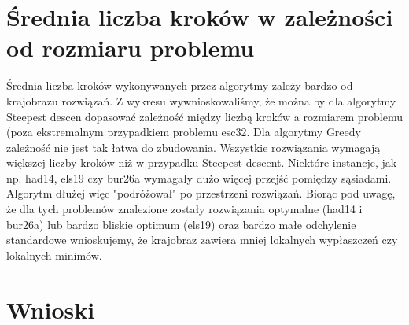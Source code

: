 \documentclass[a4paper,10pt]{article}
\begin{document}
\section{Średnia liczba kroków w zależności od rozmiaru problemu}
Średnia liczba kroków wykonywanych przez algorytmy zależy bardzo od krajobrazu rozwiązań.
Z wykresu wywnioskowaliśmy, że można by dla algorytmy Steepest descen dopasować zależność między liczbą kroków a rozmiarem problemu (poza ekstremalnym przypadkiem problemu esc32.
Dla algorytmy Greedy zależność nie jest tak łatwa do zbudowania.
Wszystkie rozwiązania wymagają większej liczby kroków niż w przypadku Steepest descent. 
Niektóre instancje, jak np. had14, els19 czy bur26a wymagały dużo więcej przejść pomiędzy sąsiadami.
Algorytm dłużej więc "podróżował" po przestrzeni rozwiązań.
Biorąc pod uwagę, że dla tych problemów znalezione zostały rozwiązania optymalne (had14 i bur26a) lub bardzo bliskie optimum (els19) oraz bardzo małe odchylenie standardowe wnioskujemy, że krajobraz zawiera mniej lokalnych wypłaszczeń czy lokalnych minimów.

\begin{center}

\end{center}

\section{Wnioski}
\end{document}
